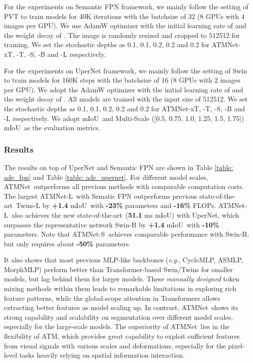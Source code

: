 \documentclass[letterpaper]{article} \usepackage{aaai23v}  \usepackage{times}  \usepackage{helvet}  \usepackage{courier}  \usepackage[hyphens]{url}  \usepackage{graphicx} \urlstyle{rm} \def\UrlFont{\rm}  \usepackage{caption} \frenchspacing  \setlength{\pdfpagewidth}{8.5in}  \setlength{\pdfpageheight}{11in}  \usepackage{algorithm}
\newcommand{\egno}{\textit{e}.\textit{g}.} \newcommand{\etcno}{\textit{etc}} \newcommand{\etal}{\textit{et al.}}
\newcommand{\ours}{{ATMNet}}
\newcommand{\ourcore}{{ATM}}
\newcommand{\oursxt}{ATMNet-xT}
\newcommand{\ourss}{ATMNet-S}
\newcommand{\oursl}{ATMNet-L}
\newcommand{\miou}{mIoU}
\newcommand{\sota}{state-of-the-art}
\begin{document}
For the experiments on Semantic FPN framework, we mainly follow the setting of PVT \cite{wang2021pyramidpvt} to train models for 40K iterations with the batchsize of 32 (8 GPUs with 4 images per GPU). We use AdamW \cite{loshchilov2017decoupledadamw} optimizer with the initial learning rate of  and the weight decay of . The image is randomly resized and cropped to 512512 for training. We set the stochastic depths as 0.1, 0.1, 0.2, 0.2 and 0.2 for \oursxt, -T, -S, -B and -L respectively.

For the experiments on UperNet framework, we mainly follow the setting of Swin \cite{liu2021swin} to train models for 160K steps with the batchsize of 16 (8 GPUs with 2 images per GPU). We adopt the AdamW \cite{loshchilov2017decoupledadamw} optimizer with the initial learning rate of  and the weight decay of . All models are trained with the input size of 512512. We set the stochastic depths as 0.1, 0.1, 0.2, 0.2 and 0.2 for \oursxt, -T, -S, -B and -L respectively. We adopt \miou~and Multi-Scale ([0.5, 0.75, 1.0, 1.25, 1.5, 1.75]) \miou~as the evaluation metrics.


\noindent
\subsubsection{Results}
The results on top of UperNet and Semantic FPN are shown in Table \ref{table: ade_fpn} and Table \ref{table: ade_upernet}. For different model scales, \ours~outperforms all previous methods with comparable computation costs. The largest \oursl~with Sematic FPN outperforms previous \sota~Twins-L by \textbf{+1.4} \miou~with \textbf{-23\%} parameters and \textbf{-16\%} FLOPs.
\oursl~also achieves the new \sota~(\textbf{51.1} ms \miou) with UperNet, which surpasses the representative network Swin-B by \textbf{+1.4} \miou~with \textbf{-10\%} parameters. Note that \ourss~achieves comparable performance with Swin-B, but only requires about \textbf{-50\%} parameters.




It also shows that most previous MLP-like backbones (\egno, CycleMLP, ASMLP, MorphMLP) perform better than Transformer-based Swin/Twins for smaller models, but lag behind them for larger models. These \textit{manually designed} token mixing methods within them leads to remarkable limitations in exploring rich feature patterns, while the global-scope attention in Transformers allows extracting better features as model scaling up.
In contrast, \ours~shows its strong capability and scalability on segmentation over different model scales, especially for the large-scale models. The superiority of \ours~lies in the flexibility of \ourcore, which provides great capability to exploit sufficient features from visual signals with various scales and deformations, especially for the pixel-level tasks heavily relying on spatial information interaction. 
\end{document}
